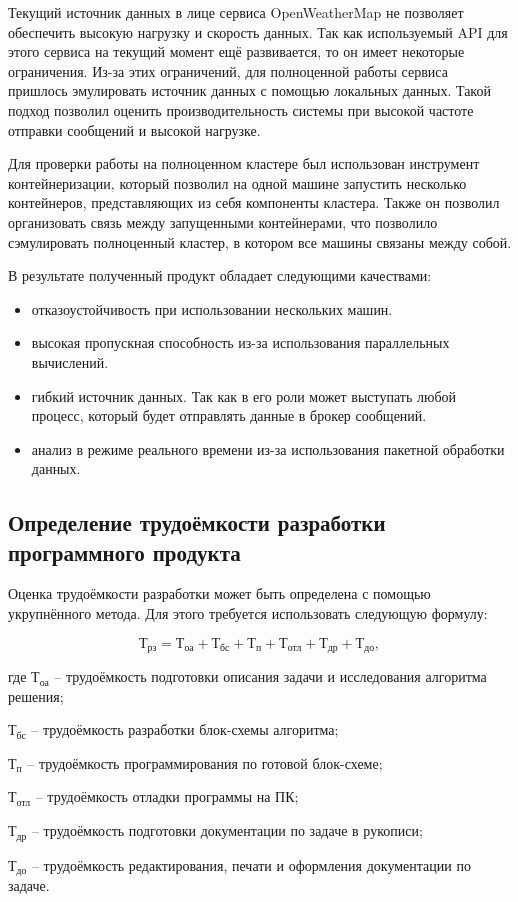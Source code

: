 Текущий источник данных в лице сервиса OpenWeatherMap не позволяет обеспечить высокую нагрузку и скорость данных.
Так как используемый API для этого сервиса на текущий момент ещё развивается, то он имеет некоторые ограничения.
Из-за этих ограничений, для полноценной работы сервиса пришлось эмулировать источник данных с помощью локальных данных.
Такой подход позволил оценить производительность системы при высокой частоте отправки сообщений и высокой нагрузке.

Для проверки работы на полноценном кластере был использован инструмент контейнеризации, который позволил на одной машине запустить несколько контейнеров, представляющих из себя компоненты кластера.
Также он позволил организовать связь между запущенными контейнерами, что позволило сэмулировать полноценный кластер, в котором все машины связаны между собой.

В результате полученный продукт обладает следующими качествами:
\begin{itemize}
  \item отказоустойчивость при использовании нескольких машин.
  \item высокая пропускная способность из-за использования параллельных вычислений.
  \item гибкий источник данных. Так как в его роли может выступать любой процесс, который будет отправлять данные в брокер сообщений.
  \item анализ в режиме реального времени из-за использования пакетной обработки данных. 
\end{itemize}

\subsection{Определение трудоёмкости разработки программного продукта}

Оценка трудоёмкости разработки может быть определена с помощью укрупнённого метода.
Для этого требуется использовать следующую формулу:

\begin{equation}
  \label{eq:econ:Trz}
  \text{Т}_\text{рз} = \text{Т}_\text{оа} +
    \text{Т}_\text{бс} +
    \text{Т}_\text{п} +
    \text{Т}_\text{отл} +
    \text{Т}_\text{др} +
    \text{Т}_\text{до} ,
\end{equation}
\begin{explanationx}
  \item[где] $ \text{Т}_\text{оа} $ -- трудоёмкость подготовки описания задачи и исследования алгоритма решения;
  \item $ \text{Т}_\text{бс} $ -- трудоёмкость разработки блок-схемы алгоритма;
  \item $ \text{Т}_\text{п} $ -- трудоёмкость программирования по готовой блок-схеме;
  \item $ \text{Т}_\text{отл} $ -- трудоёмкость отладки программы на ПК;
  \item $ \text{Т}_\text{др} $ -- трудоёмкость подготовки документации по задаче в рукописи;
  \item $ \text{Т}_\text{до} $ -- трудоёмкость редактирования, печати и оформления документации по задаче.
\end{explanationx}

